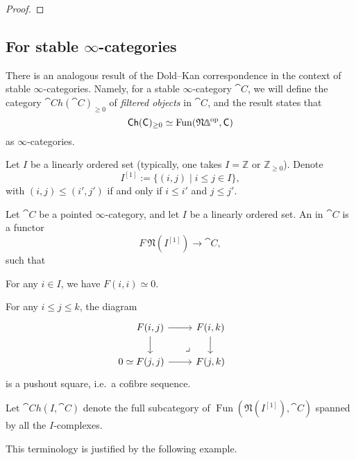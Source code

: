 \begin{proof}
    \nyw
\end{proof}

\subsection{For stable \texorpdfstring{$\infty$}{∞}-categories}

There is an analogous result of the Dold--Kan correspondence
in the context of stable $\infty$-categories.
Namely, for a stable $\infty$-category $\cat{C}$,
we will define the category $\cat{Ch}(\cat{C})_{\geq0}$ of \emph{filtered objects}
in $\cat{C}$, and the result states that
\[ \cat{Ch}(\cat{C})_{\geq0}\simeq\operatorname{Fun}(\mathfrak N\bfDelta\op,\cat{C}) \]
as $\infty$-categories.

Let $I$ be a linearly ordered set (typically, one takes
$I=\mathbb Z$ or $\mathbb Z_{\geq0}$). Denote
\[I^{[1]}:=\{(i,j)\mid i\leq j\in I\},\] 
with $(i,j)\leq(i',j')$ if and only if $i\leq i'$ and $j\leq j'$.

\begin{definition}
    Let $\cat{C}$ be a pointed $\infty$-category,
    and let $I$ be a linearly ordered set.
    An  in $\cat{C}$ is a functor 
    \[F\:\mathfrak{N}(I^{[1]})\to\cat{C},\]
    such that 
    \begin{itms}
        \item For any $i\in I$, we have $F(i,i)\simeq0$.
        \item For any $i\leq j\leq k$, the diagram 
        \[\begin{tikzcd}
            F(i,j)\ar[r]\ar[d]\ar[dr,phantom,pos=.75,"\lrcorner"] & F(i,k)\ar[d] \\
            \llap{$0\simeq{}$}F(j,j)\ar[r] & F(j,k)
        \end{tikzcd}\]
        is a pushout square, i.e.\ a cofibre sequence.
    \end{itms}
    Let $\cat{Ch}(I,\cat{C})$ denote the full subcategory of
    $\operatorname{Fun}(\mathfrak N(I^{[1]}),\cat{C})$
    spanned by all the $I$-complexes.
\end{definition}

This terminology is justified by the following example.

